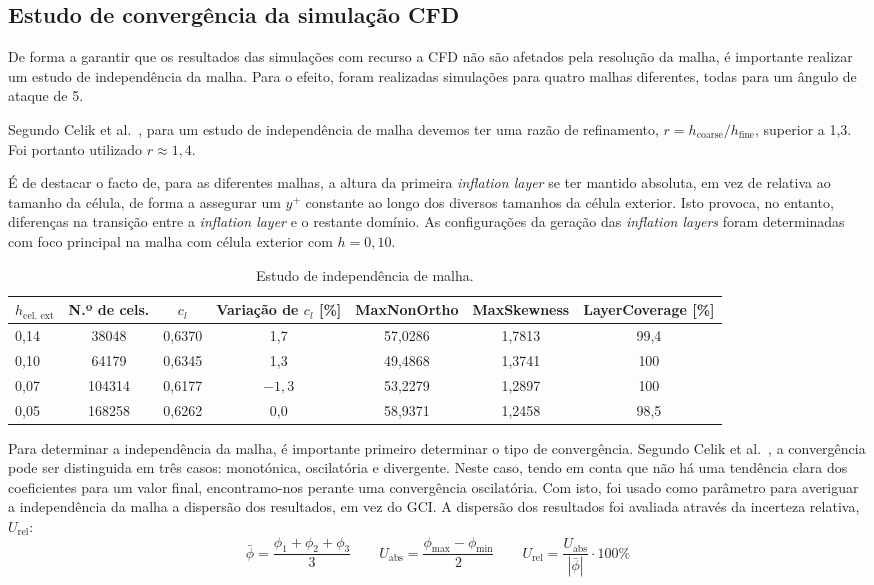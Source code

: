 \subsection*{Estudo de convergência da simulação CFD}

De forma a garantir que os resultados das simulações com recurso a CFD não são afetados pela resolução da malha, é importante realizar um estudo de independência da malha. Para o efeito, foram realizadas simulações para quatro malhas diferentes, todas para um ângulo de ataque de 5\textdegree.

Segundo Celik et al.~\cite{mesh_independence}, para um estudo de independência de malha devemos ter uma razão de refinamento, $r = h_\text{coarse} / h_\text{fine}$, superior a 1,3. Foi portanto utilizado $r\approx1{,}4$.

É de destacar o facto de, para as diferentes malhas, a altura da primeira \textit{inflation layer} se ter mantido absoluta, em vez de relativa ao tamanho da célula, de forma a assegurar um $y^+$ constante ao longo dos diversos tamanhos da célula exterior. Isto provoca, no entanto, diferenças na transição entre a \textit{inflation layer} e o restante domínio. As configurações da geração das \textit{inflation layers} foram determinadas com foco principal na malha com célula exterior com $h=0{,}10$.

\begin{table}[H]
  \centering
  \caption{Estudo de independência de malha.}
  \label{tab:malhas}
  \begin{tabular}{lcccccc}
    \hline
    $h_\text{cel. ext}$ & N.º de cels. & $c_l$ & Variação de $c_l$ [\%] & MaxNonOrtho & MaxSkewness & LayerCoverage [\%] \\
    \hline
    0,14 & 38048  & 0,6370 & 1,7  & 57,0286 & 1,7813 & 99,4\\
    0,10 & 64179  & 0,6345 & 1,3  & 49,4868 & 1,3741 & 100 \\
    0,07 & 104314 & 0,6177 & $-1{,}3$ & 53,2279 & 1,2897 & 100 \\
    0,05 & 168258 & 0,6262 & 0,0  & 58,9371 & 1,2458 & 98,5\\
    \hline
  \end{tabular}
\end{table}

Para determinar a independência da malha, é importante primeiro determinar o tipo de convergência. Segundo Celik et al.~\cite{mesh_independence}, a convergência pode ser distinguida em três casos: monotónica, oscilatória e divergente. Neste caso, tendo em conta que não há uma tendência clara dos coeficientes para um valor final, encontramo-nos perante uma convergência oscilatória. Com isto, foi usado como parâmetro para averiguar a independência da malha a dispersão dos resultados, em vez do GCI. A dispersão dos resultados foi avaliada através da incerteza relativa, $U_\mathrm{rel}$: 
\[
    \bar{\phi} = \frac{\phi_1 + \phi_2 + \phi_3}{3} \qquad U_\mathrm{abs} = \frac{\phi_\mathrm{max} - \phi_\mathrm{min}}{2} \qquad U_\mathrm{rel} = \frac{U_\mathrm{abs}}{|\bar{\phi}|} \cdot 100\%
\]

